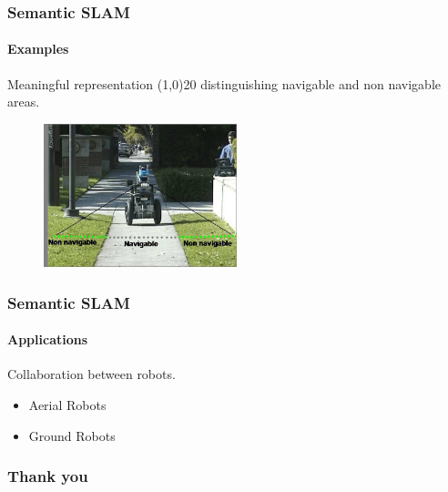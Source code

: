 \documentclass{beamer}
\begin{document}
	\begin{frame}
		\frametitle{Semantic SLAM}
		
		\framesubtitle{Examples}
		Meaningful representation \thicklines \vector(1,0){20} distinguishing navigable and non navigable areas.
		\begin{figure}
			\includegraphics[width=0.5\textwidth,height=0.6\textheight]{Navigable}
		\end{figure}
	\end{frame}




	\begin{frame}
		\frametitle{Semantic SLAM}
		
		\framesubtitle{Applications}
Collaboration between robots.
		\begin{itemize}
			\item Aerial Robots
			\item Ground Robots
		\end{itemize}

	\end{frame}





	\begin{frame}
		\frametitle{Thank you}
	\end{frame}	
\end{document}
